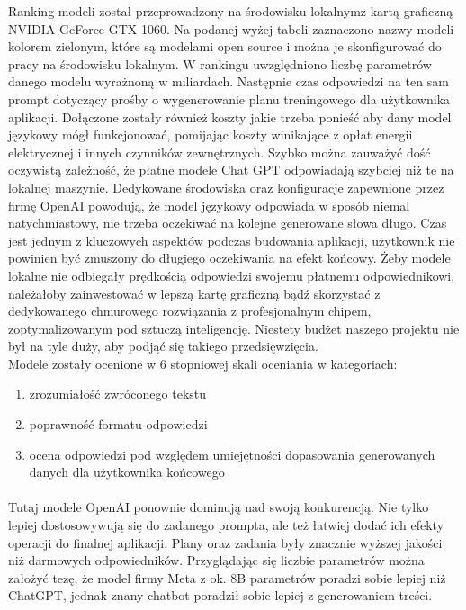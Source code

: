 Ranking modeli został przeprowadzony na środowisku lokalnym\linebreak z kartą graficzną NVIDIA GeForce GTX 1060. Na podanej wyżej tabeli zaznaczono nazwy modeli kolorem zielonym, które są modelami open source i można je skonfigurować do pracy na środowisku lokalnym. W rankingu uwzględniono liczbę parametrów danego modelu wyrażnoną w miliardach. Następnie czas odpowiedzi na ten sam prompt dotyczący prośby o wygenerowanie planu treningowego dla użytkownika aplikacji. Dołączone zostały również koszty jakie trzeba ponieść aby dany model językowy mógł funkcjonować, pomijając koszty winikające z opłat energii elektrycznej i innych czynników zewnętrznych. Szybko można zauważyć dość oczywistą zależność, że płatne modele Chat GPT odpowiadają szybciej niż te na lokalnej maszynie. Dedykowane środowiska oraz konfiguracje zapewnione przez firmę OpenAI powodują, że model językowy odpowiada w sposób niemal natychmiastowy, nie trzeba oczekiwać na kolejne generowane słowa długo. Czas jest jednym z kluczowych aspektów podczas budowania aplikacji, użytkownik nie powinien być zmuszony do długiego oczekiwania na efekt końcowy. Żeby modele lokalne nie odbiegały prędkością odpowiedzi swojemu płatnemu odpowiednikowi, należałoby zainwestować w lepszą kartę graficzną bądź skorzystać z dedykowanego chmurowego rozwiązania z profesjonalnym chipem, zoptymalizowanym pod sztuczą inteligencję. Niestety budżet naszego projektu nie był na tyle duży, aby podjąć się takiego przedsięwzięcia.
\\

\noindent Modele zostały ocenione w 6 stopniowej skali oceniania w kategoriach:
\begin{enumerate}
    \item zrozumiałość zwróconego tekstu
    \item poprawność formatu odpowiedzi
    \item ocena odpowiedzi pod względem umiejętności dopasowania generowanych danych dla użytkownika końcowego
\end{enumerate}

\paragraph{} Tutaj modele OpenAI ponownie dominują nad swoją konkurencją. Nie tylko lepiej dostosowywują się do zadanego prompta, ale też łatwiej dodać ich efekty operacji do finalnej aplikacji.
Plany oraz zadania były znacznie wyższej jakości niż darmowych odpowiedników. Przyglądając się liczbie parametrów można założyć tezę, że model firmy Meta z  ok. 8B parametrów poradzi sobie lepiej niż ChatGPT, jednak znany chatbot poradził sobie lepiej z generowaniem treści.

